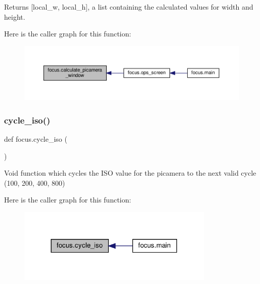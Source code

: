 \begin{DoxyReturn}{Returns}
\mbox{[}local\+\_\+w, local\+\_\+h\mbox{]}, a list containing the calculated values for width and height. 
\end{DoxyReturn}
Here is the caller graph for this function\+:
\nopagebreak
\begin{figure}[H]
\begin{center}
\leavevmode
\includegraphics[width=350pt]{namespacefocus_ace593fb72d9a91bc93d3a25614a365d0_icgraph}
\end{center}
\end{figure}
\mbox{\label{namespacefocus_aa9bf3f199d1bf68a1e49ec229dcf8c38}} 
\subsubsection{\texorpdfstring{cycle\+\_\+iso()}{cycle\_iso()}}
{\footnotesize\ttfamily def focus.\+cycle\+\_\+iso (\begin{DoxyParamCaption}{ }\end{DoxyParamCaption})}



Void function which cycles the I\+SO value for the picamera to the next valid cycle (100, 200, 400, 800) 

Here is the caller graph for this function\+:
\nopagebreak
\begin{figure}[H]
\begin{center}
\leavevmode
\includegraphics[width=266pt]{namespacefocus_aa9bf3f199d1bf68a1e49ec229dcf8c38_icgraph}
\end{center}
\end{figure}
\mbox{\label{namespacefocus_a8fb78b10ef91e414ac6707d45fcd0e5b}} 
